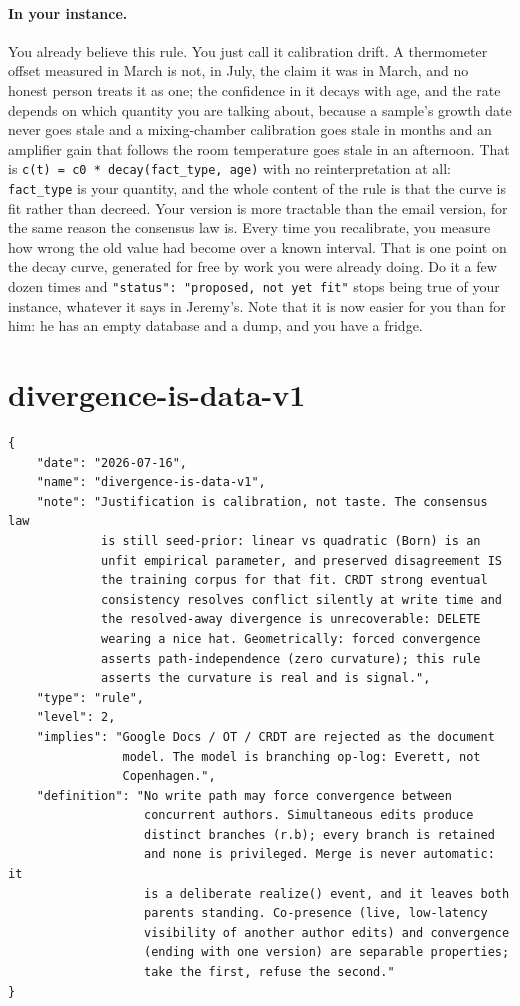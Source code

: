 \paragraph{In your instance.} You already believe this rule. You just call it calibration drift. A thermometer offset measured in March is not, in July, the claim it was in March, and no honest person treats it as one; the confidence in it decays with age, and the rate depends on which quantity you are talking about, because a sample's growth date never goes stale and a mixing-chamber calibration goes stale in months and an amplifier gain that follows the room temperature goes stale in an afternoon. That is \texttt{c(t) = c0 * decay(fact\_type, age)} with no reinterpretation at all: \texttt{fact\_type} is your quantity, and the whole content of the rule is that the curve is fit rather than decreed. Your version is more tractable than the email version, for the same reason the consensus law is. Every time you recalibrate, you measure how wrong the old value had become over a known interval. That is one point on the decay curve, generated for free by work you were already doing. Do it a few dozen times and \texttt{"status": "proposed, not yet fit"} stops being true of your instance, whatever it says in Jeremy's. Note that it is now easier for you than for him: he has an empty database and a dump, and you have a fridge.

\section{divergence-is-data-v1}

\begin{lstlisting}[language={},basicstyle=\ttfamily\footnotesize]
{
    "date": "2026-07-16",
    "name": "divergence-is-data-v1",
    "note": "Justification is calibration, not taste. The consensus law
             is still seed-prior: linear vs quadratic (Born) is an
             unfit empirical parameter, and preserved disagreement IS
             the training corpus for that fit. CRDT strong eventual
             consistency resolves conflict silently at write time and
             the resolved-away divergence is unrecoverable: DELETE
             wearing a nice hat. Geometrically: forced convergence
             asserts path-independence (zero curvature); this rule
             asserts the curvature is real and is signal.",
    "type": "rule",
    "level": 2,
    "implies": "Google Docs / OT / CRDT are rejected as the document
                model. The model is branching op-log: Everett, not
                Copenhagen.",
    "definition": "No write path may force convergence between
                   concurrent authors. Simultaneous edits produce
                   distinct branches (r.b); every branch is retained
                   and none is privileged. Merge is never automatic: it
                   is a deliberate realize() event, and it leaves both
                   parents standing. Co-presence (live, low-latency
                   visibility of another author edits) and convergence
                   (ending with one version) are separable properties;
                   take the first, refuse the second."
}
\end{lstlisting}

